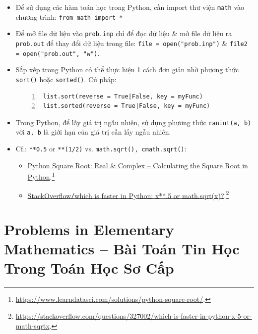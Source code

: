 \documentclass{article}
\begin{document}
\begin{itemize}
	\item Để sử dụng các hàm toán học trong Python, cần import thư viện {\tt math} vào chương trình: {\tt from math import *}
	\item Để mở file dữ liệu vào {\tt prob.inp} chỉ để đọc dữ liệu \& mở file dữ liệu ra {\tt prob.out} để thay đổi dữ liệu trong file: {\tt file = open("prob.inp")} \& {\tt file2 = open("prob.out", "w")}.
	\item Sắp xếp trong Python có thể thực hiện 1 cách đơn giản nhờ phương thức {\tt sort()} hoặc {\tt sorted()}. Cú pháp:
	\begin{Verbatim}[numbers=left,xleftmargin=5mm]
list.sort(reverse = True|False, key = myFunc)
list.sorted(reverse = True|False, key = myFunc)
	\end{Verbatim}
	\item Trong Python, để lấy giá trị ngẫu nhiên, sử dụng phương thức {\tt ranint(a, b)} với {\tt a, b} là giới hạn của giá trị cần lấy ngẫu nhiên.
	\item Cf.: \texttt{**0.5} or \texttt{**(1/2)} vs. \texttt{math.sqrt(), cmath.sqrt()}:
	\begin{itemize}
		\item \href{https://www.learndatasci.com/solutions/python-square-root/}{Python Square Root: Real \& Complex -- Calculating the Square Root in Python}.\footnote{\url{https://www.learndatasci.com/solutions/python-square-root/}.}
		\item \href{https://stackoverflow.com/questions/327002/which-is-faster-in-python-x-5-or-math-sqrtx}{StackOverflow{\tt/}which is faster in Python: x**.5 or math.sqrt(x)?}.\footnote{\url{https://stackoverflow.com/questions/327002/which-is-faster-in-python-x-5-or-math-sqrtx}.}
	\end{itemize}
\end{itemize}


\section{Problems in Elementary Mathematics  -- Bài Toán Tin Học Trong Toán Học Sơ Cấp}
\end{document}
